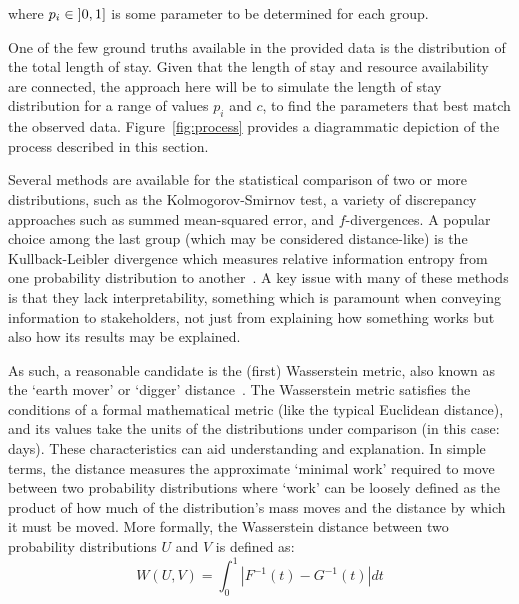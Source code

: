 \noindent where \(p_i \in \interval[open left]{0}{1}\) is some parameter to be
determined for each group.

One of the few ground truths available in the provided data is the distribution
of the total length of stay. Given that the length of stay and resource
availability are connected, the approach here will be to simulate the length of
stay distribution for a range of values \(p_i\) and \(c\), to find the
parameters that best match the observed data. Figure~\ref{fig:process} provides
a diagrammatic depiction of the process described in this section.

Several methods are available for the statistical comparison of two or more
distributions, such as the Kolmogorov-Smirnov test, a variety of discrepancy
approaches such as summed mean-squared error, and \(f\)-divergences. A popular
choice among the last group (which may be considered distance-like) is the
Kullback-Leibler divergence which measures relative information entropy from one
probability distribution to another~\cite{Kullback1951}. A key issue with many
of these methods is that they lack interpretability, something which is
paramount when conveying information to stakeholders, not just from explaining
how something works but also how its results may be explained.

As such, a reasonable candidate is the (first) Wasserstein metric, also known as
the `earth mover' or `digger' distance~\cite{Vaserstein1969}. The Wasserstein
metric satisfies the conditions of a formal mathematical metric (like the
typical Euclidean distance), and its values take the units of the distributions
under comparison (in this case: days). These characteristics can aid
understanding and explanation. In simple terms, the distance measures the
approximate `minimal work' required to move between two probability
distributions where `work' can be loosely defined as the product of how much of
the distribution's mass moves and the distance by which it must be moved. More
formally, the Wasserstein distance between two probability distributions \(U\)
and \(V\) is defined as:
\begin{equation}\label{eq:wasserstein}
    W(U, V) = \int_{0}^{1} \left\vert F^{-1}(t) - G^{-1}(t) \right\vert dt
\end{equation}

